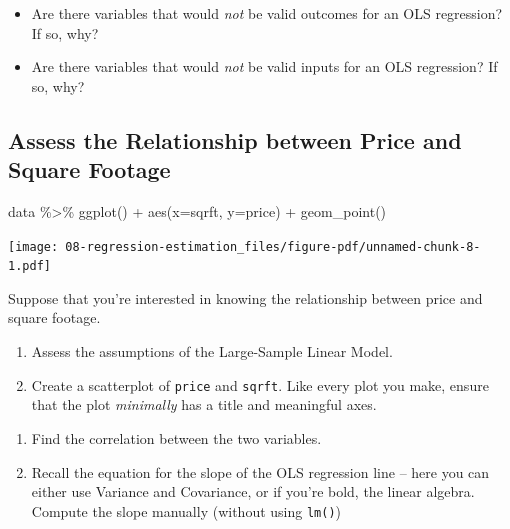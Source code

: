 \documentclass[
  letterpaper,
  DIV=11,
  numbers=noendperiod]{scrreprt}
\newenvironment{Shaded}{\begin{snugshade}}{\end{snugshade}}
\newcommand{\AttributeTok}[1]{\textcolor[rgb]{0.40,0.45,0.13}{#1}}
\newcommand{\FunctionTok}[1]{\textcolor[rgb]{0.28,0.35,0.67}{#1}}
\newcommand{\NormalTok}[1]{\textcolor[rgb]{0.00,0.23,0.31}{#1}}
\newcommand{\SpecialCharTok}[1]{\textcolor[rgb]{0.37,0.37,0.37}{#1}}
\providecommand{\tightlist}{%
  \setlength{\itemsep}{0pt}\setlength{\parskip}{0pt}}\usepackage{longtable,booktabs,array}
\begin{document}
\begin{itemize}
\tightlist
\item
  Are there variables that would \emph{not} be valid outcomes for an OLS
  regression? If so, why?
\item
  Are there variables that would \emph{not} be valid inputs for an OLS
  regression? If so, why?
\end{itemize}

\subsection{Assess the Relationship between Price and Square
Footage}\label{assess-the-relationship-between-price-and-square-footage}

\begin{Shaded}
\begin{Highlighting}[]
\NormalTok{data }\SpecialCharTok{\%\textgreater{}\%} 
  \FunctionTok{ggplot}\NormalTok{() }\SpecialCharTok{+} 
  \FunctionTok{aes}\NormalTok{(}\AttributeTok{x=}\NormalTok{sqrft, }\AttributeTok{y=}\NormalTok{price) }\SpecialCharTok{+} 
  \FunctionTok{geom\_point}\NormalTok{()}
\end{Highlighting}
\end{Shaded}

\texttt{[image: 08-regression-estimation\_files/figure-pdf/unnamed-chunk-8-1.pdf]}

Suppose that you're interested in knowing the relationship between price
and square footage.

\begin{enumerate}
\def\labelenumi{\arabic{enumi}.}
\setcounter{enumi}{-1}
\item
  Assess the assumptions of the Large-Sample Linear Model.
\item
  Create a scatterplot of \texttt{price} and \texttt{sqrft}. Like every
  plot you make, ensure that the plot \emph{minimally} has a title and
  meaningful axes.
\end{enumerate}

\begin{enumerate}
\def\labelenumi{\arabic{enumi}.}
\setcounter{enumi}{1}
\item
  Find the correlation between the two variables.
\item
  Recall the equation for the slope of the OLS regression line -- here
  you can either use Variance and Covariance, or if you're bold, the
  linear algebra. Compute the slope manually (without using
  \texttt{lm()})
\end{enumerate}
\end{document}
